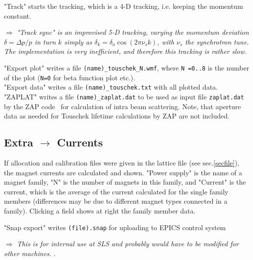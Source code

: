 \documentclass[12pt]{article}
\newcommand\todo[1]{$\Longrightarrow$ {\em #1} }
\begin{document}
"Track" starts the tracking, which is a 4-D tracking, i.e. keeping the momentum constant.

\todo{ "Track sync" is an improvised 5-D tracking, varying the momentum deviation
$\delta=\Delta p/p$ in turn $k$ simply as $\delta_k = \delta_o \cos (2\pi \nu_s k)$, with $\nu_s$ the
synchrotron tune. The implementation is very inefficient, and therefore this tracking is
rather slow.}

"Export plot" writes a file {\tt (name)\_touschek\_N.wmf}, where {\tt N =0..8} is
the number of the plot ({\tt N=0} for beta function plot etc.).\\
"Export data" writes a file {\tt (name)\_touschek.txt} with all plotted data.\\
"ZAPLAT" writes a file {\tt (name)\_zaplat.dat} to be used as input file {\tt zaplat.dat}
by the ZAP code~\cite{zap} for calculation of intra beam scattering.
Note, that aperture data as needed for Touschek lifetime calculations by ZAP are not
included.





\subsection{\label{sseccur}Extra $\longrightarrow$ Currents}
If allocation and calibration files were given in the lattice
file (see sec.\ref{secfile}), the magnet currents are calculated and shown.
"Power supply" is the name of a magnet family, "N" is the number of magnets
in this family, and "Current" is the current, which is the average of
the current calculated for the single family members (differences may
be due to different magnet types connected in a family).
Clicking a field shows at right the family member data.

"Snap export" writes {\tt (file).snap} for uploading to EPICS control system

\todo{This is for internal use at SLS and probably would have to be modified for other machines.}.
\end{document}
